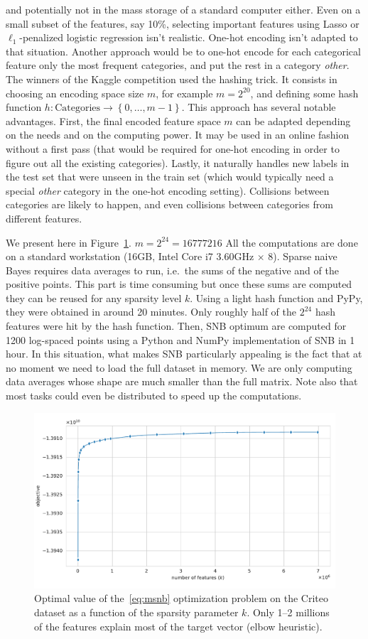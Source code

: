 and potentially not in the mass storage of a standard computer either.
Even on a small subset of the features, say 10\%,
selecting important features using Lasso or $\ell_1$-penalized logistic regression isn't realistic.
One-hot encoding isn't adapted to that situation.
Another approach would be to one-hot encode for each categorical feature only the most frequent categories,
and put the rest in a category \textit{other}.
The winners of the Kaggle competition used the hashing trick.
It consists in choosing an encoding space size $m$,
for example $m = 2^{20}$,
and defining some hash function $h \colon \text{Categories} \to \left\{ 0, \dots, m - 1 \right\}$.
This approach has several notable advantages.
First, the final encoded feature space $m$ can be adapted depending on the needs and on the computing power.
It may be used in an online fashion without a first pass
(that would be required for one-hot encoding in order to figure out all the existing categories).
Lastly, it naturally handles new labels in the test set that were unseen in the train set
(which would typically need a special \textit{other} category in the one-hot encoding setting).
Collisions between categories are likely to happen,
and even collisions between categories from different features.

We present here in Figure~\ref{fig:criteo_hash_elbow}.
$m = 2^{24} = 16777216$
All the computations are done on a standard workstation (16GB, Intel Core i7 3.60GHz $\times$ 8).
Sparse naive Bayes requires data averages to run,
i.e.\ the sums of the negative and of the positive points.
This part is time consuming but once these sums are computed they can be reused for any sparsity level $k$.
Using a light hash function and PyPy, they were obtained in around 20 minutes.
Only roughly half of the $2^{24}$ hash features were hit by the hash function.
Then, SNB optimum are computed for 1200 log-spaced points using a Python and NumPy implementation of SNB in 1 hour.
In this situation, what makes SNB particularly appealing is the fact that at no moment we need to load the full dataset
in memory.
We are only computing data averages whose shape are much smaller than the full matrix.
Note also that most tasks could even be distributed to speed up the computations.
\begin{figure}
    \centering
    \includegraphics[width=0.75\linewidth, height=0.4\linewidth]{figures/criteo_hash_elbow.pdf}
    \caption{
        Optimal value of the~\ref{eq:msnb} optimization problem on the Criteo dataset
        as a function of the sparsity parameter $k$.
        Only 1--2 millions of the features explain most of the target vector (elbow heuristic).
    }
    \label{fig:criteo_hash_elbow}
\end{figure}

